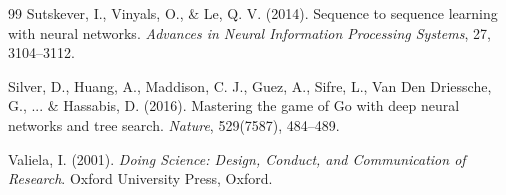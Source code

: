 \documentclass[11pt, a4paper]{article}
\begin{document}
\begin{thebibliography}{99}
	Sutskever, I., Vinyals, O., \& Le, Q. V. (2014). 
	Sequence to sequence learning with neural networks. 
	\emph{Advances in Neural Information Processing Systems}, 27, 3104--3112.
	
	Silver, D., Huang, A., Maddison, C. J., Guez, A., Sifre, L., Van Den Driessche, G., ... \& Hassabis, D. (2016). 
	Mastering the game of Go with deep neural networks and tree search. 
	\emph{Nature}, 529(7587), 484--489.
	
	Valiela, I. (2001). 
	\emph{Doing Science: Design, Conduct, and Communication of Research}. 
	Oxford University Press, Oxford.
	
\end{thebibliography}
\end{document}
